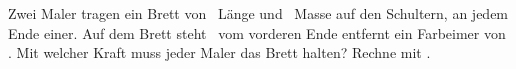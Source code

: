 Zwei Maler tragen ein Brett von \LBO\ Länge und \mBO\ Masse auf den Schultern, an jedem Ende einer. Auf dem Brett steht \xEO\ vom vorderen Ende entfernt ein Farbeimer von \mEO. Mit welcher Kraft muss jeder Maler das Brett halten? Rechne mit \gO.
